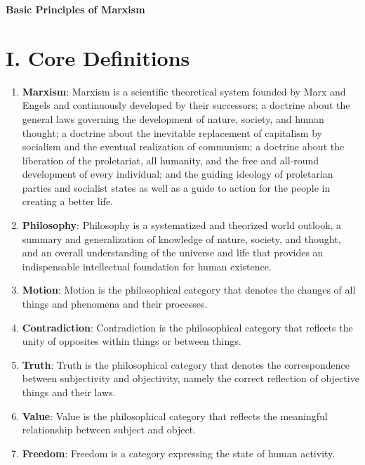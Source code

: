 \documentclass[12pt,a4paper]{ctexart}
\begin{document}
\begin{center}
    {\LARGE \textbf{Basic Principles of Marxism}}
\end{center}

\section{I. Core Definitions}

\begin{enumerate}[leftmargin=2em]
    \item \textbf{Marxism}: Marxism is a scientific theoretical system founded by Marx and Engels and continuously developed by their successors; a doctrine about the general laws governing the development of nature, society, and human thought; a doctrine about the inevitable replacement of capitalism by socialism and the eventual realization of communism; a doctrine about the liberation of the proletariat, all humanity, and the free and all-round development of every individual; and the guiding ideology of proletarian parties and socialist states as well as a guide to action for the people in creating a better life.
    
    \item \textbf{Philosophy}: Philosophy is a systematized and theorized world outlook, a summary and generalization of knowledge of nature, society, and thought, and an overall understanding of the universe and life that provides an indispensable intellectual foundation for human existence.
    
    \item \textbf{Motion}: Motion is the philosophical category that denotes the changes of all things and phenomena and their processes.
    
    \item \textbf{Contradiction}: Contradiction is the philosophical category that reflects the unity of opposites within things or between things.
    
    \item \textbf{Truth}: Truth is the philosophical category that denotes the correspondence between subjectivity and objectivity, namely the correct reflection of objective things and their laws.
    
    \item \textbf{Value}: Value is the philosophical category that reflects the meaningful relationship between subject and object.
    
    \item \textbf{Freedom}: Freedom is a category expressing the state of human activity.
    

\end{enumerate}
\end{document}
